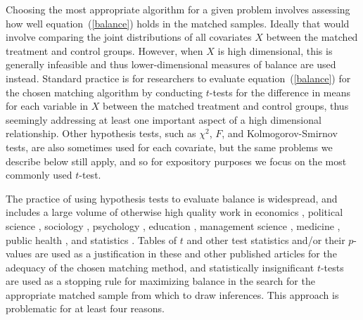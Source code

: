 \documentclass[11pt,titlepage]{article}
\begin{document}
Choosing the most appropriate algorithm for a given problem involves
assessing how well equation~(\ref{balance}) holds in the matched samples.  Ideally that would
involve comparing the joint distributions of all covariates $X$
between the matched treatment and control groups.  However, when $X$ is high
dimensional, this is generally infeasible and thus lower-dimensional
measures of balance are used instead.  Standard practice is for
researchers to evaluate equation~(\ref{balance}) for the chosen
matching algorithm by conducting $t$-tests for the difference in means
for each variable in $X$ between the matched treatment and control groups,
thus seemingly addressing at least one important aspect of a high
dimensional relationship.  Other hypothesis tests, such as $\chi^2$,
$F$, and Kolmogorov-Smirnov tests, are also sometimes used for each
covariate, but the same problems we describe below still apply, and so
for expository purposes we focus on the most commonly used $t$-test.

The practice of using hypothesis tests to evaluate balance is
widespread, and includes a large volume of otherwise high quality work
in economics \citep{LisMilFre03,BlaSmi04,AgoDyn04,DehWah99,
  DehWah02,SmiTod05}, political science \citep{Imai05,SimHop05},
sociology \citep{LunSmi05}, psychology
\citep{HavNag05,HilWalBro05,YosMagBos03,JonDAgGon04,McCRidMor04},
education \citep{Crosnoe05,SchBuc03}, management science
\citep{FreMil04, Villalonga04,WanSchAvo05}, medicine
\citep{WanSchAvo05, MacRivJur06,LinPekWan05,ManTudDie06, PetRoeMul06,
  ShiLitPot06,SabCanGib05,PerTuUnd00,AusMam06,AusMamStu05}, public
health \citep{NovReaRau06,ElBGilWu05,LauSmiSta00,BinBreEar05}, and
statistics \citep{LuZanHor01}.  Tables of $t$ and other test
statistics and/or their $p$-values are used as a justification in
these and other published articles for the adequacy of the chosen
matching method, and statistically insignificant $t$-tests are used as
a stopping rule for maximizing balance in the search for the
appropriate matched sample from which to draw inferences.  This
approach is problematic for at least four reasons.
\end{document}
